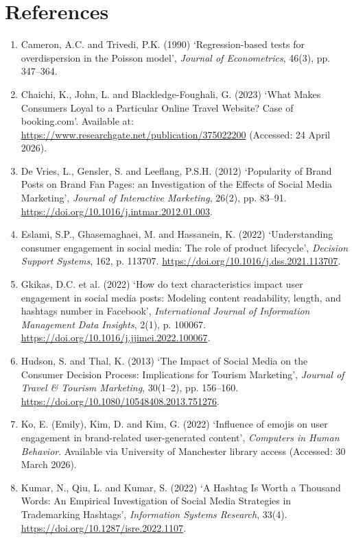 \documentclass[12pt,a4paper]{article}
\begin{document}
\section*{References}

\begin{enumerate}[leftmargin=1.5em]
    \item Cameron, A.C. and Trivedi, P.K. (1990) `Regression-based tests for overdispersion in the Poisson model', \textit{Journal of Econometrics}, 46(3), pp. 347--364.
    \item Chaichi, K., John, L. and Blackledge-Foughali, G. (2023) `What Makes Consumers Loyal to a Particular Online Travel Website? Case of booking.com'. Available at: \url{https://www.researchgate.net/publication/375022200} (Accessed: 24 April 2026).
    \item De Vries, L., Gensler, S. and Leeflang, P.S.H. (2012) `Popularity of Brand Posts on Brand Fan Pages: an Investigation of the Effects of Social Media Marketing', \textit{Journal of Interactive Marketing}, 26(2), pp. 83--91. \url{https://doi.org/10.1016/j.intmar.2012.01.003}.
    \item Eslami, S.P., Ghasemaghaei, M. and Hassanein, K. (2022) `Understanding consumer engagement in social media: The role of product lifecycle', \textit{Decision Support Systems}, 162, p. 113707. \url{https://doi.org/10.1016/j.dss.2021.113707}.
    \item Gkikas, D.C. et al. (2022) `How do text characteristics impact user engagement in social media posts: Modeling content readability, length, and hashtags number in Facebook', \textit{International Journal of Information Management Data Insights}, 2(1), p. 100067. \url{https://doi.org/10.1016/j.jjimei.2022.100067}.
    \item Hudson, S. and Thal, K. (2013) `The Impact of Social Media on the Consumer Decision Process: Implications for Tourism Marketing', \textit{Journal of Travel \& Tourism Marketing}, 30(1--2), pp. 156--160. \url{https://doi.org/10.1080/10548408.2013.751276}.
    \item Ko, E. (Emily), Kim, D. and Kim, G. (2022) `Influence of emojis on user engagement in brand-related user-generated content', \textit{Computers in Human Behavior}. Available via University of Manchester library access (Accessed: 30 March 2026).
    \item Kumar, N., Qiu, L. and Kumar, S. (2022) `A Hashtag Is Worth a Thousand Words: An Empirical Investigation of Social Media Strategies in Trademarking Hashtags', \textit{Information Systems Research}, 33(4). \url{https://doi.org/10.1287/isre.2022.1107}.

\end{enumerate}
\end{document}
